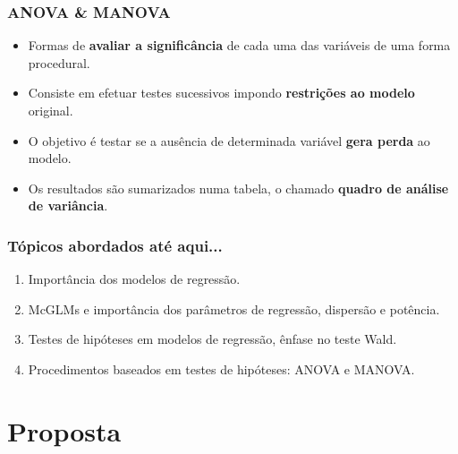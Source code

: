 \documentclass[10pt,
  aspectratio=169,
  serif,
  mathserif,
  professionalfont,
  compress,
  handout,
  ]{beamer}\usepackage[]{graphicx}\usepackage[]{color}
\begin{document}
\begin{frame}
  \frametitle{ANOVA \& MANOVA}

  \begin{itemize}
    \itemsep 2ex

  \item Formas de \textbf{avaliar a significância} de cada uma das variáveis de uma forma procedural.  
  
  \item Consiste em efetuar testes sucessivos impondo \textbf{restrições ao modelo} original. 

  \item O objetivo é testar se a ausência de determinada variável \textbf{gera perda} ao modelo. 

  \item Os resultados são sumarizados numa tabela, o chamado \textbf{quadro de análise de variância}.
  
  \end{itemize}

\end{frame}



\begin{frame}
  \frametitle{Tópicos abordados até aqui...}

\begin{enumerate}

  \itemsep 2ex
  
  \item Importância dos modelos de regressão.

  \item McGLMs e importância dos parâmetros de regressão, dispersão e potência.

  \item Testes de hipóteses em modelos de regressão, ênfase no teste Wald.
  
  \item Procedimentos baseados em testes de hipóteses: ANOVA e MANOVA.
  
\end{enumerate}

\end{frame}


\section{Proposta}
\end{document}
